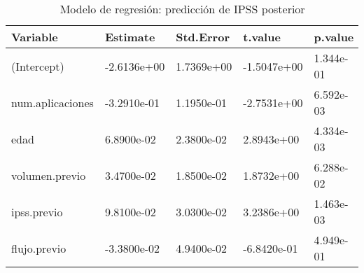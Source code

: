 \begin{table}[ht]
\centering
\caption{Modelo de regresión: predicción de IPSS posterior} 
\label{tab:modelo_ipss}
\begin{tabular}{lllll}
  \hline
Variable & Estimate & Std.Error & t.value & p.value \\ 
  \hline
(Intercept) & -2.6136e+00 & 1.7369e+00 & -1.5047e+00 & 1.344e-01 \\ 
  num.aplicaciones & -3.2910e-01 & 1.1950e-01 & -2.7531e+00 & 6.592e-03 \\ 
  edad &  6.8900e-02 & 2.3800e-02 &  2.8943e+00 & 4.334e-03 \\ 
  volumen.previo &  3.4700e-02 & 1.8500e-02 &  1.8732e+00 & 6.288e-02 \\ 
  ipss.previo &  9.8100e-02 & 3.0300e-02 &  3.2386e+00 & 1.463e-03 \\ 
  flujo.previo & -3.3800e-02 & 4.9400e-02 & -6.8420e-01 & 4.949e-01 \\ 
   \hline
\end{tabular}
\end{table}
